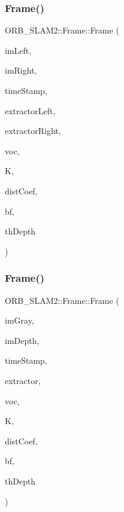 \subsubsection{\texorpdfstring{Frame()}{Frame()}\hspace{0.1cm}{\footnotesize\ttfamily [3/5]}}
{\footnotesize\ttfamily O\+R\+B\+\_\+\+S\+L\+A\+M2\+::\+Frame\+::\+Frame (\begin{DoxyParamCaption}\item[{const cv\+::\+Mat \&}]{im\+Left,  }\item[{const cv\+::\+Mat \&}]{im\+Right,  }\item[{const double \&}]{time\+Stamp,  }\item[{\mbox{\hyperlink{class_o_r_b___s_l_a_m2_1_1_o_r_bextractor}{O\+R\+Bextractor}} $\ast$}]{extractor\+Left,  }\item[{\mbox{\hyperlink{class_o_r_b___s_l_a_m2_1_1_o_r_bextractor}{O\+R\+Bextractor}} $\ast$}]{extractor\+Right,  }\item[{\mbox{\hyperlink{namespace_o_r_b___s_l_a_m2_a2fafba714858cab1bb18d438e2e83c5d}{O\+R\+B\+Vocabulary}} $\ast$}]{voc,  }\item[{cv\+::\+Mat \&}]{K,  }\item[{cv\+::\+Mat \&}]{dist\+Coef,  }\item[{const float \&}]{bf,  }\item[{const float \&}]{th\+Depth }\end{DoxyParamCaption})}

\mbox{\label{class_o_r_b___s_l_a_m2_1_1_frame_ac205fd2081c647e4841369828902f8fe}} 
\subsubsection{\texorpdfstring{Frame()}{Frame()}\hspace{0.1cm}{\footnotesize\ttfamily [4/5]}}
{\footnotesize\ttfamily O\+R\+B\+\_\+\+S\+L\+A\+M2\+::\+Frame\+::\+Frame (\begin{DoxyParamCaption}\item[{const cv\+::\+Mat \&}]{im\+Gray,  }\item[{const cv\+::\+Mat \&}]{im\+Depth,  }\item[{const double \&}]{time\+Stamp,  }\item[{\mbox{\hyperlink{class_o_r_b___s_l_a_m2_1_1_o_r_bextractor}{O\+R\+Bextractor}} $\ast$}]{extractor,  }\item[{\mbox{\hyperlink{namespace_o_r_b___s_l_a_m2_a2fafba714858cab1bb18d438e2e83c5d}{O\+R\+B\+Vocabulary}} $\ast$}]{voc,  }\item[{cv\+::\+Mat \&}]{K,  }\item[{cv\+::\+Mat \&}]{dist\+Coef,  }\item[{const float \&}]{bf,  }\item[{const float \&}]{th\+Depth }\end{DoxyParamCaption})}

